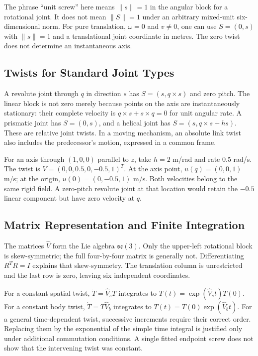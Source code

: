 The phrase ``unit screw'' here means $\|s\|=1$ in the angular block for a rotational joint. It does not mean $\|S\|=1$ under an arbitrary mixed-unit six-dimensional norm. For pure translation, $\omega=0$ and $v\ne0$, one can use $S=(0,s)$ with $\|s\|=1$ and a translational joint coordinate in metres. The zero twist does not determine an instantaneous axis.

\subsection{Twists for Standard Joint Types}

A revolute joint through $q$ in direction $s$ has $S=(s,q\times s)$ and zero pitch. The linear block is not zero merely because points on the axis are instantaneously stationary: their complete velocity is $q\times s+s\times q=0$ for unit angular rate. A prismatic joint has $S=(0,s)$, and a helical joint has $S=(s,q\times s+hs)$. These are relative joint twists. In a moving mechanism, an absolute link twist also includes the predecessor's motion, expressed in a common frame.

For an axis through $(1,0,0)$ parallel to $z$, take $h=2$ m/rad and rate $0.5$ rad/s. The twist is $V=(0,0,0.5,0,-0.5,1)^T$. At the axis point, $u(q)=(0,0,1)$ m/s; at the origin, $u(0)=(0,-0.5,1)$ m/s. Both velocities belong to the same rigid field. A zero-pitch revolute joint at that location would retain the $-0.5$ linear component but have zero velocity at $q$.

\subsection{Matrix Representation and Finite Integration}

The matrices $\widehat V$ form the Lie algebra $\mathfrak{se}(3)$. Only the upper-left rotational block is skew-symmetric; the full four-by-four matrix is generally not. Differentiating $R^TR=I$ explains that skew-symmetry. The translation column is unrestricted and the last row is zero, leaving six independent coordinates.

For a constant spatial twist, $\dot T=\widehat V_sT$ integrates to $T(t)=\exp(\widehat V_st)T(0)$. For a constant body twist, $\dot T=T\widehat V_b$ integrates to $T(t)=T(0)\exp(\widehat V_bt)$. For a general time-dependent twist, successive increments require their correct order. Replacing them by the exponential of the simple time integral is justified only under additional commutation conditions. A single fitted endpoint screw does not show that the intervening twist was constant.

